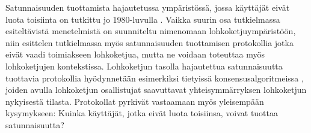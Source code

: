 Satunnaisuuden tuottamista hajautetussa ympäristössä, jossa käyttäjät eivät luota toisiinta on tutkittu jo 1980-luvulla \cite{10.1145/1008908.1008911}. Vaikka suurin osa tutkielmassa esiteltävistä menetelmistä on suunniteltu nimenomaan lohkoketjuympäristöön, niin esittelen tutkielmassa myös satunnaisuuden tuottamisen protokollia jotka eivät vaadi toimiakseen lohkoketjua, mutta ne voidaan toteuttaa myös lohkoketjujen kontekstissa. Lohkoketjun tasolla hajautettua satunnaisuutta tuottavia protokollia hyödynnetään esimerkiksi tietyissä konsensusalgoritmeissa \cite{gilad_algorand_2017, hanke_dfinity_2018}, joiden avulla lohkoketjun osallistujat saavuttavat yhteisymmärryksen lohkoketjun nykyisestä tilasta.  Protokollat pyrkivät vastaamaan myös yleisempään kysymykseen: Kuinka käyttäjät, jotka eivät luota toisiinsa, voivat tuottaa satunnaisuutta? 